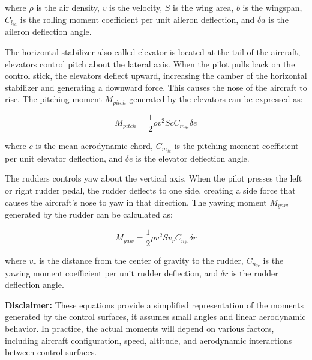 where $\rho$ is the air density, $v$ is the velocity, $S$ is the wing area, $b$ is the wingspan, $C_{l_{\delta a}}$ is the rolling moment coefficient per unit aileron deflection, and $\delta a$ is the aileron deflection angle.

The horizontal stabilizer also called elevator is located at the tail of the aircraft, elevators control pitch about the lateral axis. When the pilot pulls back on the control stick, the elevators deflect upward, increasing the camber of the horizontal stabilizer and generating a downward force. This causes the nose of the aircraft to rise. The pitching moment $M_{pitch}$ generated by the elevators can be expressed as:

\begin{equation}
    M_{pitch} = \frac{1}{2} \rho v^2 S c C_{m_{\delta e}} \delta e
\end{equation}

where $c$ is the mean aerodynamic chord, $C_{m_{\delta e}}$ is the pitching moment coefficient per unit elevator deflection, and $\delta e$ is the elevator deflection angle.

The rudders controls yaw about the vertical axis. When the pilot presses the left or right rudder pedal, the rudder deflects to one side, creating a side force that causes the aircraft's nose to yaw in that direction. The yawing moment $M_{yaw}$ generated by the rudder can be calculated as:

\begin{equation}
    M_{yaw} = \frac{1}{2} \rho v^2 S v_r C_{n_{\delta r}} \delta r
\end{equation}

where $v_r$ is the distance from the center of gravity to the rudder, $C_{n_{\delta r}}$ is the yawing moment coefficient per unit rudder deflection, and $\delta r$ is the rudder deflection angle.

\textbf{Disclaimer:} These equations provide a simplified representation of the moments generated by the control surfaces, it assumes small angles and linear aerodynamic behavior. In practice, the actual moments will depend on various factors, including aircraft configuration, speed, altitude, and aerodynamic interactions between control surfaces.

